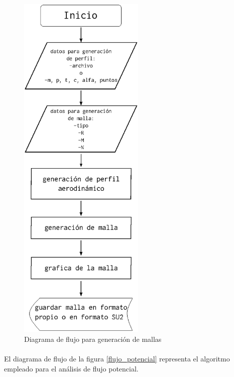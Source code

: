 \documentclass[letterpaper, openright, 12pt]{book}
\begin{document}
    \begin{figure}[htbp!]
        \centering
        \includegraphics[width=60mm]{./Imagenes/flujo_malla}
        \caption{Diagrama de flujo para generación de mallas}
        \label{flujo_malla}
    \end{figure}

    \paragraph*{}
        El diagrama de flujo de la figura \ref{flujo_potencial} representa el
        algoritmo empleado para el análisis de flujo potencial.
\end{document}
